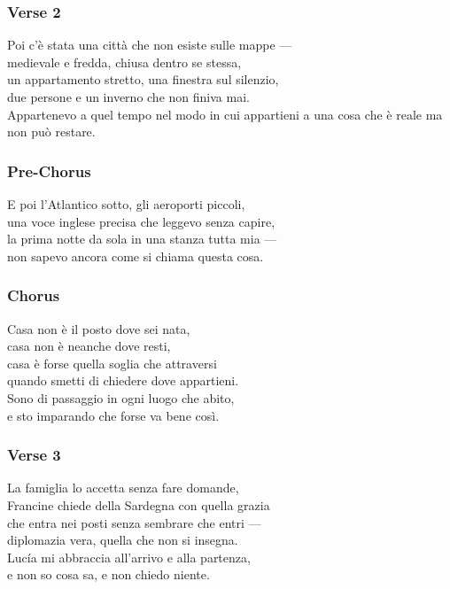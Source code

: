 \subsubsection{Verse 2}\label{verse-2-10}

Poi c'è stata una città che non esiste sulle mappe ---\\
medievale e fredda, chiusa dentro se stessa,\\
un appartamento stretto, una finestra sul silenzio,\\
due persone e un inverno che non finiva mai.\\
Appartenevo a quel tempo nel modo in cui appartieni a una cosa che è
reale ma non può restare.

\subsubsection{Pre-Chorus}\label{pre-chorus-23}

E poi l'Atlantico sotto, gli aeroporti piccoli,\\
una voce inglese precisa che leggevo senza capire,\\
la prima notte da sola in una stanza tutta mia ---\\
non sapevo ancora come si chiama questa cosa.

\subsubsection{Chorus}\label{chorus-33}

Casa non è il posto dove sei nata,\\
casa non è neanche dove resti,\\
casa è forse quella soglia che attraversi\\
quando smetti di chiedere dove appartieni.\\
Sono di passaggio in ogni luogo che abito,\\
e sto imparando che forse va bene così.

\subsubsection{Verse 3}\label{verse-3-7}

La famiglia lo accetta senza fare domande,\\
Francine chiede della Sardegna con quella grazia\\
che entra nei posti senza sembrare che entri ---\\
diplomazia vera, quella che non si insegna.\\
Lucía mi abbraccia all'arrivo e alla partenza,\\
e non so cosa sa, e non chiedo niente.

